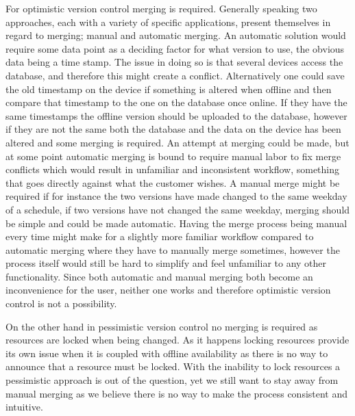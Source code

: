 For optimistic version control merging is required. 
Generally speaking two approaches, each with a variety of specific applications, present themselves in regard to merging; manual and automatic merging.
An automatic solution would require some data point as a deciding factor for what version to use, the obvious data being a time stamp.
The issue in doing so is that several devices access the database, and therefore this might create a conflict.
Alternatively one could save the old timestamp on the device if something is altered when offline and then compare that timestamp to the one on the database once online. 
If they have the same timestamps the offline version should be uploaded to the database, however if they are not the same both the database and the data on the device has been altered and some merging is required. 
An attempt at merging could be made, but at some point automatic merging is bound to require manual labor to fix merge conflicts which would result in unfamiliar and inconsistent workflow, something that goes directly against what the customer wishes.
A manual merge might be required if for instance the two versions have made changed to the same weekday of a schedule, if two versions have not changed the same weekday, merging should be simple and could be made automatic.
Having the merge process being manual every time might make for a slightly more familiar workflow compared to automatic merging where they have to manually merge sometimes, however the process itself would still be hard to simplify and feel unfamiliar to any other functionality. 
Since both automatic and manual merging both become an inconvenience for the user, neither one works and therefore optimistic version control is not a possibility.

\bigskip
On the other hand in pessimistic version control no merging is required as resources are locked when being changed.
As it happens locking resources provide its own issue when it is coupled with offline availability as there is no way to announce that a resource must be locked.
With the inability to lock resources a pessimistic approach is out of the question, yet we still want to stay away from manual merging as we believe there is no way to make the process consistent and intuitive.

